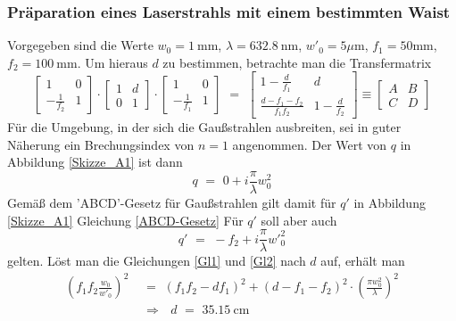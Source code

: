 \documentclass[11pt,a4paper,oneside]{scrartcl}
\begin{document}
\subsubsection{Präparation eines Laserstrahls mit einem bestimmten Waist}
Vorgegeben sind die Werte $w_0 = 1\ \mathrm{mm}$, $\lambda = 632.8\ \mathrm{nm}$, ${w'}_0 = 5 \mu \mathrm m$, $f_1 = 50\mathrm{mm}$, $f_2 = 100\ \mathrm{mm}$. Um hieraus $d$ zu bestimmen, betrachte man die Transfermatrix
\begin{equation}
\begin{bmatrix}
    1 & 0 \\
    -\frac{1}{f_2} & 1 
\end{bmatrix}
\cdot
 \begin{bmatrix}
    1 & d \\
    0 & 1 
\end{bmatrix}
\cdot
 \begin{bmatrix}
    1 & 0 \\
    -\frac{1}{f_1} & 1 
\end{bmatrix}
\,\,=\,\,
 \begin{bmatrix}
   1-\frac{d}{f_1} & d \\
    \frac{d-f_1-f_2}{f_1 f_2} & 1-\frac{d}{f_2} 
\end{bmatrix}
\equiv
 \begin{bmatrix}
   A & B \\
    C & D 
\end{bmatrix}
\end{equation}
Für die Umgebung, in der sich die Gaußstrahlen ausbreiten, sei in guter Näherung ein Brechungsindex von $n=1$ angenommen. Der Wert von $q$ in Abbildung \ref{Skizze_A1} ist dann
\begin{equation}
q \,\,=\,\, 0 + i \frac{\pi}{\lambda} w_{0}^2
\end{equation}
Gemäß dem 'ABCD'-Gesetz für Gaußstrahlen gilt damit für $q'$ in Abbildung \ref{Skizze_A1} Gleichung \ref{ABCD-Gesetz}
Für $q'$ soll aber auch
\begin{equation}\label{Gl2}
q' \,\,=\,\, -f_2 + i \frac{\pi}{\lambda} {w'}_{0}^{2}
\end{equation}
gelten. Löst man die Gleichungen \ref{Gl1} und \ref{Gl2} nach $d$ auf, erhält man
\begin{align}
\left( f_1 f_2 \frac{w_0}{{w'}_{0}} \right)^2 \,\,&=\,\, \left( f_1 f_2 - d f_1 \right)^2 + \left( d - f_1 - f_2 \right)^2 \cdot \left(\frac{\pi w_{0}^{2}}{\lambda} \right)^2\\ \quad&
\Rightarrow \,\,\,\, d \,\,=\,\, 35.15\ \mathrm{cm}
\end{align}
\end{document}

